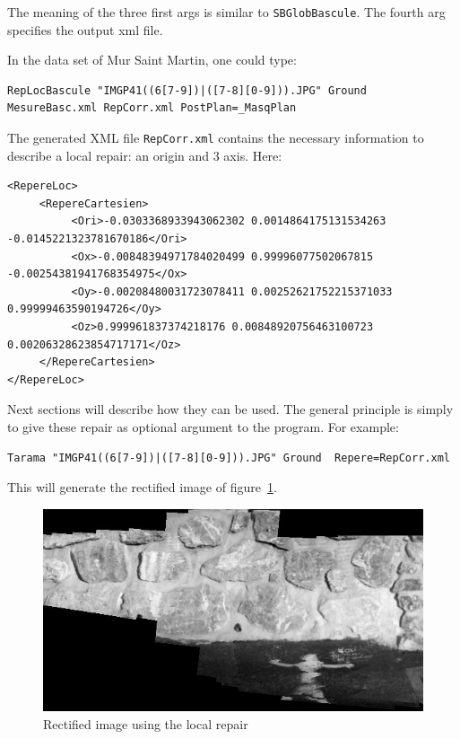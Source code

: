 The meaning of the three first args is similar to {\tt SBGlobBascule}. The fourth 
arg specifies the output xml file.

In the data set of Mur Saint Martin, one could type:

\begin{verbatim}
RepLocBascule "IMGP41((6[7-9])|([7-8][0-9])).JPG" Ground MesureBasc.xml RepCorr.xml PostPlan=_MasqPlan
\end{verbatim}

The generated XML file {\tt RepCorr.xml} contains the necessary information to
describe a local repair: an origin and $3$ axis. Here:

\begin{verbatim}
<RepereLoc>
     <RepereCartesien>
          <Ori>-0.0303368933943062302 0.0014864175131534263 -0.0145221323781670186</Ori>
          <Ox>-0.00848394971784020499 0.99996077502067815 -0.00254381941768354975</Ox>
          <Oy>-0.00208480031723078411 0.00252621752215371033 0.99999463590194726</Oy>
          <Oz>0.999961837374218176 0.00848920756463100723 0.00206328623854717171</Oz>
     </RepereCartesien>
</RepereLoc>
\end{verbatim}

Next sections will describe how they can be used. The general principle is
simply to give these repair as optional argument to the program. For
example:

\begin{verbatim}
Tarama "IMGP41((6[7-9])|([7-8][0-9])).JPG" Ground  Repere=RepCorr.xml
\end{verbatim}

This will generate the rectified image of figure~\ref{FIG:OkRec:StMartin}.
 
\begin{figure}
\begin{center}
\includegraphics[width=120mm]{FIGS/MurSaintMartin/TA_OK-LeChantier.jpg}
\end{center}
\caption{Rectified image using the local repair}
\label{FIG:OkRec:StMartin}
\end{figure}



